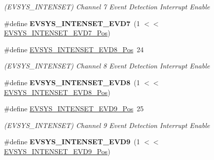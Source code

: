 \begin{DoxyCompactItemize}
\begin{DoxyCompactList}\small\item\em (E\+V\+S\+Y\+S\+\_\+\+I\+N\+T\+E\+N\+S\+E\+T) Channel 7 Event Detection Interrupt Enable \end{DoxyCompactList}\item 
\hypertarget{group___s_a_m_l21___e_v_s_y_s_gafda5b44a342446c9f4d74f59cdb44818}{}\#define {\bfseries E\+V\+S\+Y\+S\+\_\+\+I\+N\+T\+E\+N\+S\+E\+T\+\_\+\+E\+V\+D7}~(1 $<$$<$ \hyperlink{group___s_a_m_l21___e_v_s_y_s_ga6e76acb48a65a547fd7cdd6190b4dd37}{E\+V\+S\+Y\+S\+\_\+\+I\+N\+T\+E\+N\+S\+E\+T\+\_\+\+E\+V\+D7\+\_\+\+Pos})\label{group___s_a_m_l21___e_v_s_y_s_gafda5b44a342446c9f4d74f59cdb44818}

\item 
\hypertarget{group___s_a_m_l21___e_v_s_y_s_gacf4f75ea8d378a5758b8055b66c48e3d}{}\#define \hyperlink{group___s_a_m_l21___e_v_s_y_s_gacf4f75ea8d378a5758b8055b66c48e3d}{E\+V\+S\+Y\+S\+\_\+\+I\+N\+T\+E\+N\+S\+E\+T\+\_\+\+E\+V\+D8\+\_\+\+Pos}~24\label{group___s_a_m_l21___e_v_s_y_s_gacf4f75ea8d378a5758b8055b66c48e3d}

\begin{DoxyCompactList}\small\item\em (E\+V\+S\+Y\+S\+\_\+\+I\+N\+T\+E\+N\+S\+E\+T) Channel 8 Event Detection Interrupt Enable \end{DoxyCompactList}\item 
\hypertarget{group___s_a_m_l21___e_v_s_y_s_gabbee6a76fe65a20ab6eeca772eff1287}{}\#define {\bfseries E\+V\+S\+Y\+S\+\_\+\+I\+N\+T\+E\+N\+S\+E\+T\+\_\+\+E\+V\+D8}~(1 $<$$<$ \hyperlink{group___s_a_m_l21___e_v_s_y_s_gacf4f75ea8d378a5758b8055b66c48e3d}{E\+V\+S\+Y\+S\+\_\+\+I\+N\+T\+E\+N\+S\+E\+T\+\_\+\+E\+V\+D8\+\_\+\+Pos})\label{group___s_a_m_l21___e_v_s_y_s_gabbee6a76fe65a20ab6eeca772eff1287}

\item 
\hypertarget{group___s_a_m_l21___e_v_s_y_s_ga6d464562962dce018c4aaf9d6edb0258}{}\#define \hyperlink{group___s_a_m_l21___e_v_s_y_s_ga6d464562962dce018c4aaf9d6edb0258}{E\+V\+S\+Y\+S\+\_\+\+I\+N\+T\+E\+N\+S\+E\+T\+\_\+\+E\+V\+D9\+\_\+\+Pos}~25\label{group___s_a_m_l21___e_v_s_y_s_ga6d464562962dce018c4aaf9d6edb0258}

\begin{DoxyCompactList}\small\item\em (E\+V\+S\+Y\+S\+\_\+\+I\+N\+T\+E\+N\+S\+E\+T) Channel 9 Event Detection Interrupt Enable \end{DoxyCompactList}\item 
\hypertarget{group___s_a_m_l21___e_v_s_y_s_ga5595a3faab015f633f8ef93d5d92bbe4}{}\#define {\bfseries E\+V\+S\+Y\+S\+\_\+\+I\+N\+T\+E\+N\+S\+E\+T\+\_\+\+E\+V\+D9}~(1 $<$$<$ \hyperlink{group___s_a_m_l21___e_v_s_y_s_ga6d464562962dce018c4aaf9d6edb0258}{E\+V\+S\+Y\+S\+\_\+\+I\+N\+T\+E\+N\+S\+E\+T\+\_\+\+E\+V\+D9\+\_\+\+Pos})\label{group___s_a_m_l21___e_v_s_y_s_ga5595a3faab015f633f8ef93d5d92bbe4}


\end{DoxyCompactItemize}
